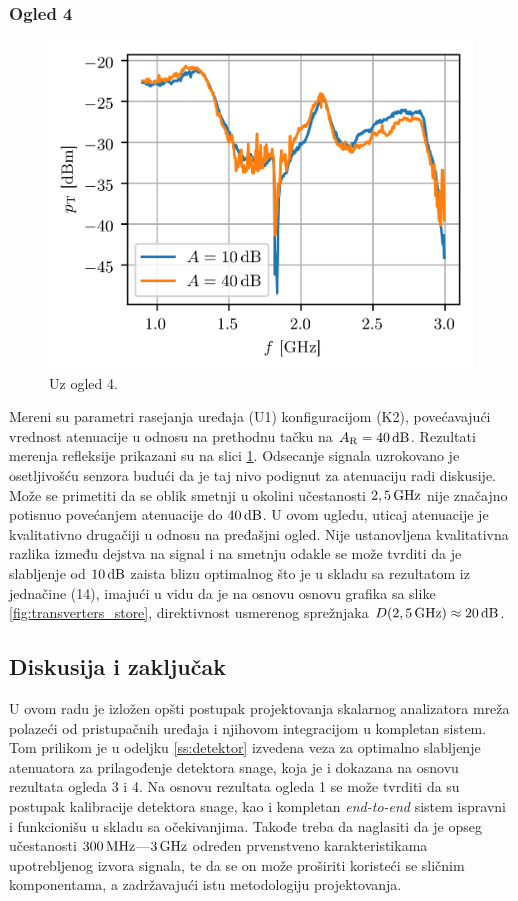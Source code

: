 \documentclass[a4paper, 12pt, diplomski]{etf}
\newcommand{\unit}[1]{\,{\rm #1}}
\begin{document}
\subsubsection{Ogled 4}
%
\begin{figure}[b!]
    \centering
    \includegraphics{fig/pR_bpf2.png}
    \caption{Uz ogled 4.}
    \label{fig:ogled4}
\end{figure}
%
Mereni su parametri rasejanja uređaja (U1) 
konfiguracijom (K2), povećavajući vrednost
atenuacije u odnosu na prethodnu tačku na
$A_{\rm R} = 40\unit{dB}$. Rezultati merenja 
refleksije prikazani su na slici 
\ref{fig:ogled4}. Odsecanje signala  
uzrokovano je osetljivošću senzora budući
da je taj nivo podignut za atenuaciju 
radi diskusije. Može se primetiti da se 
oblik smetnji u okolini učestanosti 
$2,5\unit{GHz}$ nije značajno potisnuo
povećanjem atenuacije do $40\unit{dB}$. 
U ovom ugledu, uticaj atenuacije je kvalitativno drugačiji
u odnosu na pređašjni ogled. Nije 
ustanovljena kvalitativna razlika između dejstva 
na signal i na smetnju odakle se može tvrditi da 
je slabljenje od $10 \unit{dB}$ zaista blizu optimalnog
što je u skladu sa rezultatom iz jednačine (14), 
imajući u vidu 
da je na osnovu osnovu grafika sa slike
\ref{fig:transverters_store}, direktivnost usmerenog
sprežnjaka $D(2,5\unit{GHz}) \approx 
20\unit{dB}$.

\subsection{Diskusija i zaključak}
U ovom radu je izložen opšti postupak projektovanja 
skalarnog analizatora mreža polazeći od pristupačnih uređaja
i njihovom integracijom u kompletan sistem. Tom prilikom je u
odeljku \ref{ss:detektor}
izvedena veza za optimalno slabljenje atenuatora za prilagođenje
detektora snage, koja je i dokazana na osnovu rezultata ogleda 3 i 4. 
Na osnovu rezultata ogleda 1 se može tvrditi da su postupak kalibracije
detektora snage, kao i kompletan \textit{end-to-end} sistem ispravni 
i funkcionišu u skladu sa očekivanjima. Takođe treba da naglasiti
da je opseg učestanosti $300\unit{MHz}$---$3\unit{GHz}$ određen prvenstveno
karakteristikama upotrebljenog izvora signala, te da se on može proširiti
koristeći se sličnim komponentama, a zadržavajući istu metodologiju
projektovanja. 
\end{document}
